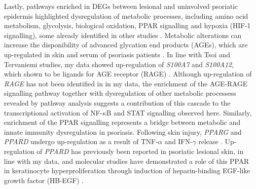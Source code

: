 Lastly, pathways enriched in DEGs between lesional and uninvolved psoriatic epidermis highlighted dysregulation of metabolic processes, including amino acid metabolism, glycolysis, biological oxidation, PPAR signalling and hypoxia (HIF-1 signalling), some already identified in other studies \parencite{Coda2012, Gudjonsson2010,Aterido2016, Tervaniemi2016}. %
Metabolic alterations can increase the disponibility of advanced glycation end products (AGEs), which are up-regulated in skin and serum of psoriasis patients \parencite{Papagrigoraki2017}. In line with Tsoi and Tervaniemi studies, my data showed up-regulation of \textit{S100A7} and \textit{S100A12}, which shown to be ligands for AGE receptor (RAGE) \parencite{Eckert2004,Moser2007,Broome2003}. Although up-regulation of \textit{RAGE} has not been identified in in my data, the enrichment of the AGE-RAGE signalling pathway together with dysregulation of other metabolic processess revealed by pathway analysis suggests a contribution of this cascade to the transcriptional activation of NF-$\kappa$B and STAT signalling observed here. Similarly, enrichment of the PPAR signalling represents a bridge between metabolic and innate immunity dysregulation in psoriasis. %
Following skin injury, \textit{PPARG} and \textit{PPARD} undergo up-regulation as a result of TNF-$\alpha$ and IFN-$\gamma$ release \parencite{Tan2001}. Up-regulation of \textit{PPARD} has previously been reported in psoriatic lesional skin, in line with my data, and molecular studies have demonstrated a role of this PPAR  in keratinocyte hyperproliferation through induction of heparin-binding EGF-like growth factor (HB-EGF) \parencite{Romanowska2008}.



